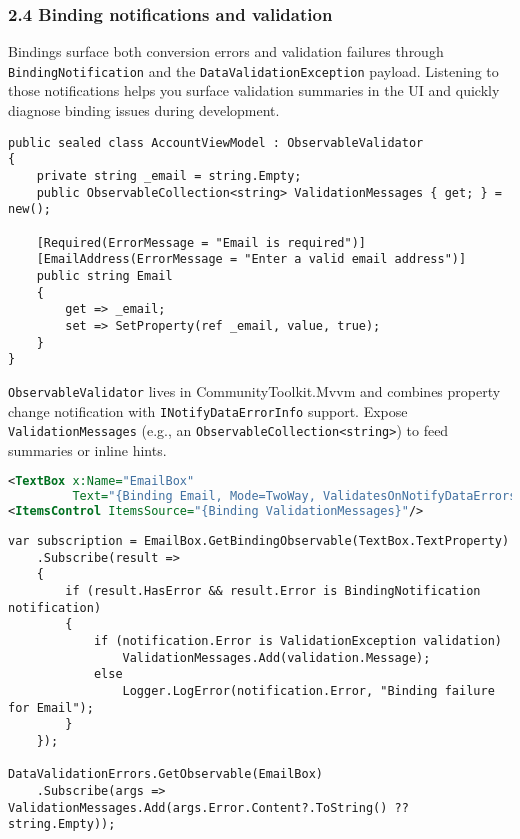 \subsubsection{2.4 Binding notifications and
validation}\label{binding-notifications-and-validation}

Bindings surface both conversion errors and validation failures through
\passthrough{\lstinline!BindingNotification!} and the
\passthrough{\lstinline!DataValidationException!} payload. Listening to
those notifications helps you surface validation summaries in the UI and
quickly diagnose binding issues during development.

\begin{lstlisting}
public sealed class AccountViewModel : ObservableValidator
{
    private string _email = string.Empty;
    public ObservableCollection<string> ValidationMessages { get; } = new();

    [Required(ErrorMessage = "Email is required")]
    [EmailAddress(ErrorMessage = "Enter a valid email address")]
    public string Email
    {
        get => _email;
        set => SetProperty(ref _email, value, true);
    }
}
\end{lstlisting}

\passthrough{\lstinline!ObservableValidator!} lives in
CommunityToolkit.Mvvm and combines property change notification with
\passthrough{\lstinline!INotifyDataErrorInfo!} support. Expose
\passthrough{\lstinline!ValidationMessages!} (e.g., an
\passthrough{\lstinline!ObservableCollection<string>!}) to feed
summaries or inline hints.

\begin{lstlisting}[language=XML]
<TextBox x:Name="EmailBox"
         Text="{Binding Email, Mode=TwoWay, ValidatesOnNotifyDataErrors=True, UpdateSourceTrigger=PropertyChanged}"/>
<ItemsControl ItemsSource="{Binding ValidationMessages}"/>
\end{lstlisting}

\begin{lstlisting}
var subscription = EmailBox.GetBindingObservable(TextBox.TextProperty)
    .Subscribe(result =>
    {
        if (result.HasError && result.Error is BindingNotification notification)
        {
            if (notification.Error is ValidationException validation)
                ValidationMessages.Add(validation.Message);
            else
                Logger.LogError(notification.Error, "Binding failure for Email");
        }
    });

DataValidationErrors.GetObservable(EmailBox)
    .Subscribe(args => ValidationMessages.Add(args.Error.Content?.ToString() ?? string.Empty));
\end{lstlisting}

